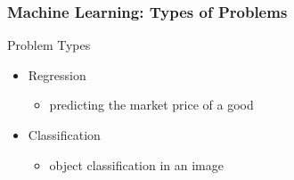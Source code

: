 \begin{frame}[t]
\begin{center}
  \end{center}
\end{frame}


\begin{frame}[t]
  \frametitle{Machine Learning: Types of Problems}
  \begin{block}{Problem Types}
    \begin{itemize}
    \item Regression
      \begin{itemize}
      \item predicting the market price of a good
      \end{itemize}%
      \item Classification
        \begin{itemize}
        \item object classification in an image
        \end{itemize}
    \end{itemize}
  \end{block}%
  \begin{center}

\end{center}
\end{frame}
